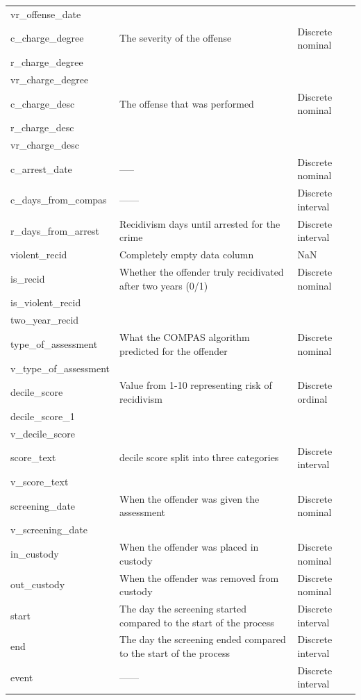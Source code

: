 \documentclass[11pt, fleqn, titlepage]{article}
\begin{document}
\begin{longtable}{l l l}
		vr\_offense\_date & & \\ \hdashline
		c\_charge\_degree & The severity of the offense & Discrete nominal \\
		r\_charge\_degree & & \\
		vr\_charge\_degree & & \\ \hdashline
		c\_charge\_desc & The offense that was performed & Discrete nominal \\
		r\_charge\_desc & & \\
		vr\_charge\_desc & & \\ \hdashline
		c\_arrest\_date & ----- & Discrete nominal \\
		c\_days\_from\_compas & ------ & Discrete interval \\
		r\_days\_from\_arrest & Recidivism days until arrested for the crime & Discrete interval \\
		violent\_recid & Completely empty data column & NaN \\ \hdashline
		is\_recid & Whether the offender truly recidivated after two years (0/1) & Discrete nominal \\
		is\_violent\_recid & & \\
		two\_year\_recid & & \\ \hdashline
		type\_of\_assessment & What the COMPAS algorithm predicted for the offender & Discrete nominal \\
		v\_type\_of\_assessment & & \\ \hdashline
		decile\_score & Value from 1-10 representing risk of recidivism & Discrete ordinal \\
		decile\_score\_1 & & \\
		v\_decile\_score & & \\ \hdashline
		score\_text & decile score split into three categories & Discrete interval \\
		v\_score\_text & & \\ \hdashline
		screening\_date & When the offender was given the assessment & Discrete nominal \\
		v\_screening\_date & & \\ \hdashline
		in\_custody & When the offender was placed in custody & Discrete nominal \\
		out\_custody & When the offender was removed from custody & Discrete nominal \\
		start & The day the screening started compared to the start of the process & Discrete interval \\
		end & The day the screening ended compared to the start of the process & Discrete interval \\
		event & ------ & Discrete interval
	\end{longtable}
		
\end{document}
